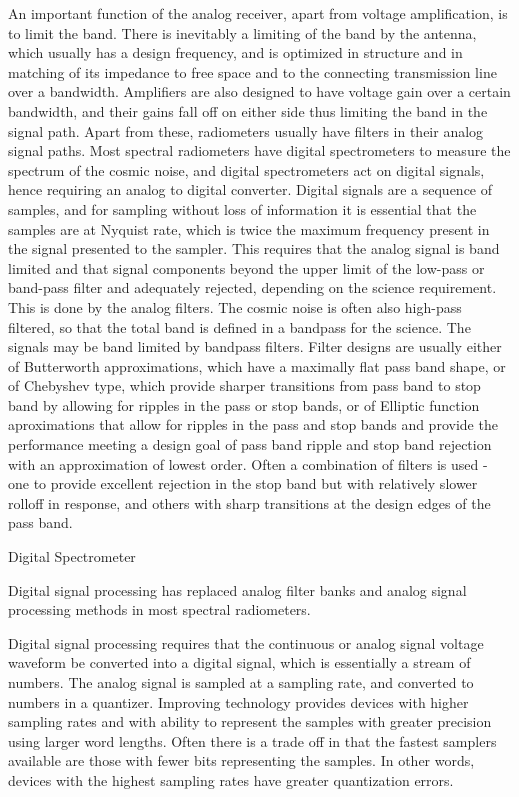    An important function of the analog receiver, apart from voltage amplification, is to limit the band. There is inevitably a limiting of the band by the antenna, which usually has a design frequency, and is optimized in structure and in matching of its impedance to free space and to the connecting transmission line over a bandwidth.  Amplifiers are also designed to have voltage gain over a certain bandwidth, and their gains fall off on either side thus limiting the band in the signal path.  Apart from these, radiometers usually have filters in their analog signal paths. Most spectral radiometers have digital spectrometers to measure the spectrum of the cosmic noise, and digital spectrometers act on digital signals, hence requiring an analog to digital converter.  Digital signals are a sequence of samples, and for sampling without loss of information it is essential that the samples are at Nyquist rate, which is twice the maximum frequency present in the signal presented to the sampler. This requires that the analog signal is band limited and that signal components beyond the upper limit of the low-pass or band-pass filter and adequately rejected, depending on the science requirement. This is done by the analog filters.  The cosmic noise is often also high-pass filtered, so that the total band is defined in a bandpass for the science.  The signals may be band limited by bandpass filters.  Filter designs are usually either of Butterworth approximations, which have a maximally flat pass band shape, or of Chebyshev type, which provide sharper transitions from pass band to stop band by allowing for ripples in the pass or stop bands, or of Elliptic function aproximations that allow for ripples in the pass and stop bands and provide the performance meeting a design goal of pass band ripple and stop band rejection with an approximation of lowest order.  Often a combination of filters is used - one to provide excellent rejection in the stop band but with relatively slower rolloff in response, and others with sharp transitions at the design edges of the pass band.  
   
  \item
  Digital Spectrometer
  
  Digital signal processing has replaced analog filter banks and analog signal processing methods in most spectral radiometers. 
  
  Digital signal processing requires that the continuous or analog signal voltage waveform be converted into a digital signal, which is essentially a stream of numbers.  The analog signal is sampled at a sampling rate, and converted to numbers in a quantizer.  Improving technology provides devices with higher sampling rates and with ability to represent the samples with greater precision using larger word lengths.  Often there is a trade off in that the fastest samplers available are those with fewer bits representing the samples.  In other words, devices with the highest sampling rates have greater quantization errors. 
  
